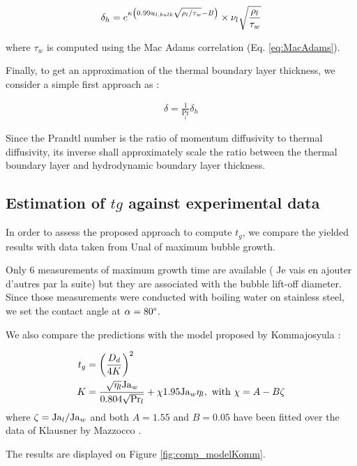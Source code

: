 \begin{align}
\delta_{h}=e^{\kappa \left( 0.99u_{l,bulk}\sqrt{\rho_{l}/\tau_{w}}-B \right)}\times \nu_{l}\sqrt{\frac{\rho_{l}}{\tau_{w}}}
\end{align}

where $\tau_{w}$ is computed using the Mac Adams correlation (Eq. \ref{eq:MacAdams}).

\npar

Finally, to get an approximation of the thermal boundary layer thickness, we consider a simple first approach as :

\begin{align}
\delta=\frac{1}{\Pr_{l}}\delta_{h}
\end{align}

Since the Prandtl number is the ratio of momentum diffusivity to thermal diffusivity, its inverse shall approximately scale the ratio between the thermal boundary layer and hydrodynamic boundary layer thickness. 

\npar

\subsection{Estimation of $t{g}$ against experimental data}

In order to assess the proposed approach to compute $t_{g}$, we compare the yielded results with data taken from Unal of maximum bubble growth. 

\npar

Only 6 measurements of maximum growth time are available ({\color{red} Je vais en ajouter d'autres par la suite}) but they are associated with the bubble lift-off diameter. Since those measurements were conducted with boiling water on stainless steel, we set the contact angle at $\alpha=80\degree$.

\npar

We also compare the predictions with the model proposed by Kommajosyula :

\begin{align}
t_{g}&=\left(  \frac{D_{d}}{4K} \right)^{2}\\
K&=\frac{\sqrt{\eta_{l}} \mathrm{Ja}_{w}}{0.804\sqrt{\mathrm{Pr}_{l}}}+\chi 1.95\mathrm{Ja}_{w} \eta_{l},\ \text{with}\ \chi=A-B\zeta
\end{align}
where $\zeta=\mathrm{Ja}_{l}/\mathrm{Ja}_{w}$ and both $A=1.55$ and $B=0.05$ have been fitted over the data of Klausner by Mazzocco \etal.

\npar

The results are displayed on Figure \ref{fig:comp_modelKomm}.

